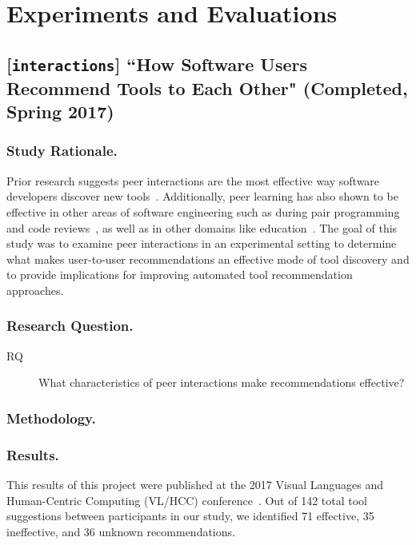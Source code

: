 \documentclass[runningheads]{llncs}
\begin{document}
\section{Experiments and Evaluations}

\subsection{[\texttt{interactions}] ``How Software Users Recommend Tools to Each Other" (Completed, Spring 2017)}

\subsubsection{Study Rationale.}

Prior research suggests peer interactions are the most effective way software developers discover new tools~\cite{Murphy-Hill2015HowDoUsers,Murphy-Hill2011PeerInteraction}. Additionally, peer learning has also shown to be effective in other areas of software engineering such as during pair programming~\cite{} and code reviews~\cite{}, as well as in other domains like education~\cite{}. The goal of this study was to examine peer interactions in an experimental setting to determine what makes user-to-user recommendations an effective mode of tool discovery and to provide implications for improving automated tool recommendation approaches.

\subsubsection{Research Question.}

\begin{description}
  \item[RQ] What characteristics of peer interactions make recommendations effective?
\end{description}

\subsubsection{Methodology.}

\subsubsection{Results.}

This results of this project were published at the 2017 Visual Languages and Human-Centric Computing (VL/HCC) conference~\cite{Interactions}. Out of 142 total tool suggestions between participants in our study, we identified 71 effective, 35 ineffective, and 36 unknown recommendations.
\end{document}
